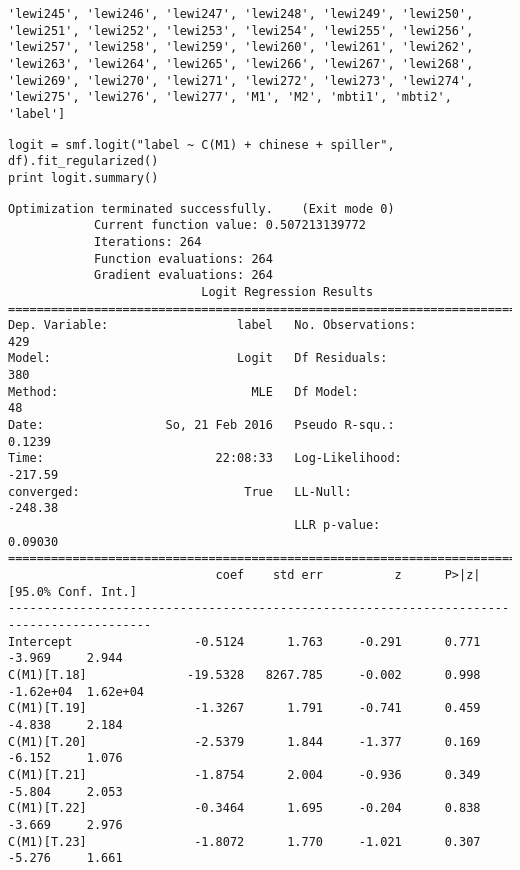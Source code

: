 \documentclass[12pt,fleqn]{article}\usepackage{../common}
\begin{document}
\begin{verbatim}
'lewi245', 'lewi246', 'lewi247', 'lewi248', 'lewi249', 'lewi250', 'lewi251', 'lewi252', 'lewi253', 'lewi254', 'lewi255', 'lewi256', 'lewi257', 'lewi258', 'lewi259', 'lewi260', 'lewi261', 'lewi262', 'lewi263', 'lewi264', 'lewi265', 'lewi266', 'lewi267', 'lewi268', 'lewi269', 'lewi270', 'lewi271', 'lewi272', 'lewi273', 'lewi274', 'lewi275', 'lewi276', 'lewi277', 'M1', 'M2', 'mbti1', 'mbti2', 'label']
\end{verbatim}

\begin{verbatim}
logit = smf.logit("label ~ C(M1) + chinese + spiller", df).fit_regularized()
print logit.summary()
\end{verbatim}

\begin{verbatim}
Optimization terminated successfully.    (Exit mode 0)
            Current function value: 0.507213139772
            Iterations: 264
            Function evaluations: 264
            Gradient evaluations: 264
                           Logit Regression Results                           
==============================================================================
Dep. Variable:                  label   No. Observations:                  429
Model:                          Logit   Df Residuals:                      380
Method:                           MLE   Df Model:                           48
Date:                 So, 21 Feb 2016   Pseudo R-squ.:                  0.1239
Time:                        22:08:33   Log-Likelihood:                -217.59
converged:                       True   LL-Null:                       -248.38
                                        LLR p-value:                   0.09030
==========================================================================================
                             coef    std err          z      P>|z|      [95.0% Conf. Int.]
------------------------------------------------------------------------------------------
Intercept                 -0.5124      1.763     -0.291      0.771        -3.969     2.944
C(M1)[T.18]              -19.5328   8267.785     -0.002      0.998     -1.62e+04  1.62e+04
C(M1)[T.19]               -1.3267      1.791     -0.741      0.459        -4.838     2.184
C(M1)[T.20]               -2.5379      1.844     -1.377      0.169        -6.152     1.076
C(M1)[T.21]               -1.8754      2.004     -0.936      0.349        -5.804     2.053
C(M1)[T.22]               -0.3464      1.695     -0.204      0.838        -3.669     2.976
C(M1)[T.23]               -1.8072      1.770     -1.021      0.307        -5.276     1.661

\end{verbatim}
\end{document}
